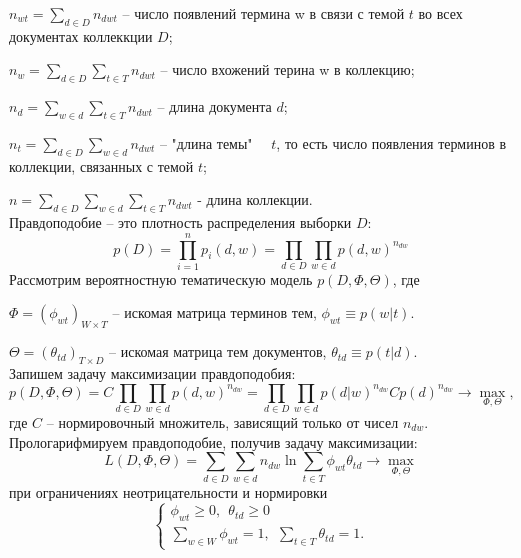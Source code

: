 \documentclass[12pt]{article}
\renewcommand{\geq}{\geqslant}
\begin{document}
$n_{wt} = \sum_{d \in D} n_{dwt}$ -- число появлений термина w в связи с темой $t$ во всех документах коллеккции $D$;

$n_{w} = \sum_{d \in D}\sum_{t \in T} n_{dwt}$ -- число вхожений терина w в коллекцию;

$n_{d} = \sum_{w \in d}\sum_{t \in T} n_{dwt}$ -- длина документа $d$;

$n_{t} = \sum_{d \in D}\sum_{w \in d} n_{dwt}$ -- "длина темы" \ \ $t$, то есть число появления терминов в коллекции, связанных с темой $t$;

$n = \sum_{d \in D}\sum_{w \in d}\sum_{t \in T} n_{dwt}$ - длина коллекции.
\ \\
Правдоподобие --  это плотность распределения выборки $D$:
\[
p(D)=\prod^n_{i=1}p_i(d,w)=\prod_{d \in D}\prod_{w \in d}p(d,w)^{n_{dw}}
\]
Рассмотрим вероятностную тематическую модель $p(D,\Phi,\Theta)$, где 

$\Phi=(\phi_{wt})_{W \times T}$ -- искомая матрица терминов тем, $\phi_{wt} \equiv p(w|t)$.

$\Theta=(\theta_{td})_{T \times D}$ -- искомая матрица тем документов, $\theta_{td}\equiv p(t|d)$.
\ \\
Запишем задачу максимизации правдоподобия:
\[
p(D,\Phi,\Theta)=C\prod_{d \in D}\prod_{w \in d}p(d,w)^{n_{dw}}=\prod_{d \in D}\prod_{w \in d}p(d|w)^{n_{dw}}Cp(d)^{n_{dw}} \to \max_{\Phi,\Theta},
\]
где $C$ -- нормировочный множитель, зависящий только от чисел $n_{dw}$. Прологарифмируем правдоподобие, получив задачу максимизации:
\[
L(D,\Phi,\Theta)=\sum_{d \in D}\sum_{w \in d}n_{dw}\ln\sum_{t \in T}\phi_{wt}\theta_{td} \to \max_{\Phi,\Theta}
\]
при ограничениях неотрицательности и нормировки
\[
\left\{
	\begin{aligned}
		\phi_{wt} \geq 0,~~\theta_{td} \geq 0\\
		\sum_{w \in W} \phi_{wt} = 1,~~\sum_{t \in T} \theta_{td}  = 1.
	\end{aligned}
\right.
\]
\end{document}
